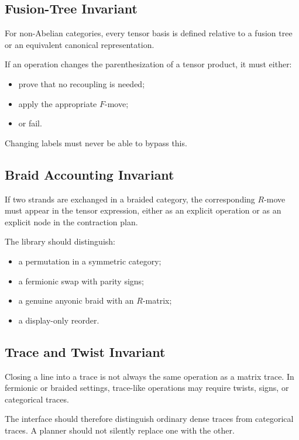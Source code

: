 \documentclass[11pt]{article}
\begin{document}
\subsection{Fusion-Tree Invariant}

For non-Abelian categories, every tensor basis is defined relative to a
fusion tree or an equivalent canonical representation.

If an operation changes the parenthesization of a tensor product, it
must either:

\begin{itemize}[nosep]
  \item prove that no recoupling is needed;
  \item apply the appropriate \(F\)-move;
  \item or fail.
\end{itemize}

Changing labels must never be able to bypass this.

\subsection{Braid Accounting Invariant}

If two strands are exchanged in a braided category, the corresponding
\(R\)-move must appear in the tensor expression, either as an explicit
operation or as an explicit node in the contraction plan.

The library should distinguish:

\begin{itemize}[nosep]
  \item a permutation in a symmetric category;
  \item a fermionic swap with parity signs;
  \item a genuine anyonic braid with an \(R\)-matrix;
  \item a display-only reorder.
\end{itemize}

\subsection{Trace and Twist Invariant}

Closing a line into a trace is not always the same operation as a
matrix trace.  In fermionic or braided settings, trace-like operations
may require twists, signs, or categorical traces.

The interface should therefore distinguish ordinary dense traces from
categorical traces.  A planner should not silently replace one with
the other.
\end{document}
